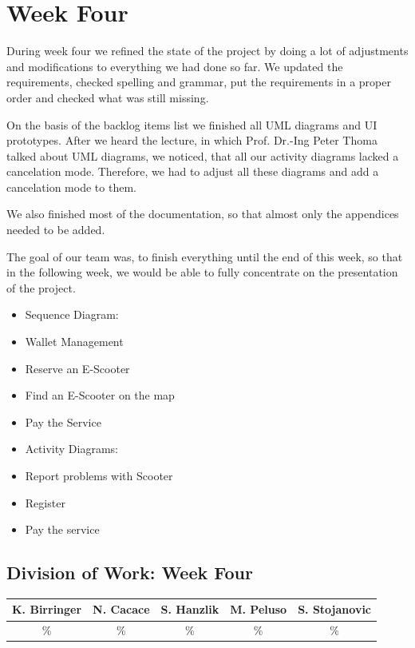 \documentclass[a4paper, 12pt]{article}
\begin{document}
\section{Week Four}
During week four we refined the state of the project by doing a lot of adjustments and modifications to everything we had done so far.
We updated the requirements, checked spelling and grammar, put the requirements in a proper order and checked what was still missing.

On the basis of the backlog items list we finished all UML diagrams and UI prototypes.
After we heard the lecture, in which Prof. Dr.-Ing Peter Thoma talked about UML diagrams, we  noticed, that all our activity diagrams lacked a cancelation mode. Therefore, we had to adjust all these diagrams and add a cancelation mode to them. 

We also finished most of the documentation, so that almost only the appendices needed to be added.

The goal of our team was, to finish everything until the end of this week, so that in the following week, we would be able to fully concentrate on the presentation of the project.

\begin{itemize}
\item Sequence Diagram:
	\item Wallet Management
	\item Reserve an E-Scooter
	\item Find an E-Scooter on the map
	\item Pay the Service

\item Activity Diagrams:
	\item Report problems with Scooter
	\item Register
	\item Pay the service
\end{itemize}

\subsection{Division of Work: Week Four}

\begin{table}[h]
\centering
\setlength{\tabcolsep}{10pt}
\begin{tabular}{|c|c|c|c|c|}
\hline
K. Birringer & N. Cacace & S. Hanzlik & M. Peluso & S. Stojanovic\\
\hline
\% & \% & \% & \% & \% \\ 
\hline
\end{tabular}
\end{table}
\end{document}
